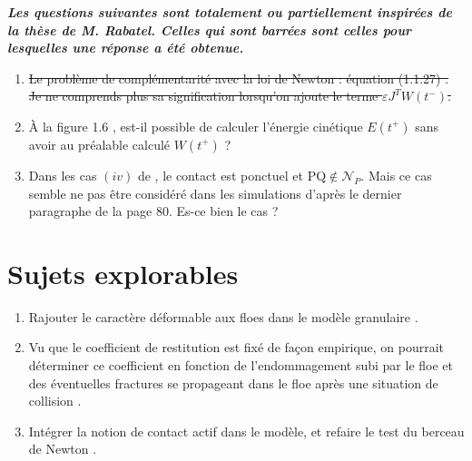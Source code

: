 \documentclass[
  french,
	11pt, %
]{fphw}
\newcommand{\bvec}[1]{\bm{\mathrm{#1}}}  %
\begin{document}
\textbf{\textit{Les questions suivantes sont totalement ou partiellement inspirées de la thèse de M. Rabatel. Celles qui sont barrées sont celles pour lesquelles une réponse a été obtenue.}}

\begin{enumerate}
  \item \sout{Le problème de complémentarité avec la loi de Newton : équation (1.1.27) \parencite[p.41]{rabatel2015thesis}. Je ne comprends plus sa signification lorsqu'on ajoute le terme $\varepsilon J^T W(t^{-})$.}
  \item À la figure 1.6 \parencite[p.43]{rabatel2015thesis}, est-il possible de calculer l'énergie cinétique $E(t^+)$ sans avoir au préalable calculé $W(t^+)$ ?
  \item Dans les cas $(iv)$ de \parencite[p.79]{rabatel2015thesis}, le contact est ponctuel et $\bvec{PQ} \notin \mathcal{N}_P$. Mais ce cas semble ne pas être considéré dans les simulations d'après le dernier paragraphe de la page $80$. Es-ce bien le cas ?
\end{enumerate}




\section{Sujets explorables}

\begin{enumerate}
  \item Rajouter le caractère déformable aux floes dans le modèle granulaire \parencite[p.12]{rabatel2015thesis}.
  \item Vu que le coefficient de restitution est fixé de façon empirique, on pourrait déterminer ce coefficient en fonction de l’endommagement subi par le floe et des éventuelles fractures se propageant dans le floe après une situation de collision \parencite[p.14]{rabatel2015thesis}.
  \item Intégrer la notion de contact actif \parencite[p.86]{rabatel2015thesis} dans le modèle, et refaire le test du berceau de Newton \parencite[p.108]{rabatel2015thesis}.
\end{enumerate}

\clearpage   %
\printbibliography
\end{document}
